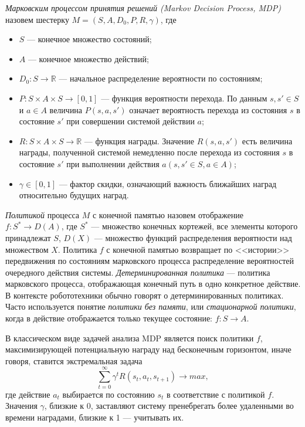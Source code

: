 \documentclass[a4, 14pt]{article}
\begin{document}
\textit{Марковским процессом принятия решений (Markov Decision Process, MDP)} 
назовем шестерку $M = (S, A, D_0, P, R, \gamma)$, где
\begin{itemize}
  \item $S$ --- конечное множество состояний;
  \item $A$ --- конечное множество действий;
  \item $D_0: S\rightarrow\mathbb{R}$ --- начальное распределение вероятности по состояниям;
  \item $P: S\times{A}\times{S}\rightarrow[0,1]$ --- функция вероятности перехода. 
    По данным $s, s' \in S$ и $a \in A$ величина $P(s,a,s')$ означает вероятность 
    перехода из состояния $s$ в состояние $s'$ при совершении системой действии $a$;
  \item $R: S\times{A}\times{S}\rightarrow\mathbb{R}$ --- функция награды. Значение 
    $R(s,a,s')$ есть величина награды, полученной системой немедленно после 
    перехода из состояния $s$ в состояние $s'$ при выполнении действия 
    $a (s,s' \in S, a \in A)$;
  \item $\gamma \in [0,1]$ --- фактор скидки, означающий важность ближайших 
    наград относительно будущих наград.
\end{itemize}

\textit{Политикой} процесса $M$ с конечной памятью назовем отображение $f: S^*\rightarrow{D}(A)$, 
где  $S^*$ --- множество конечных кортежей, все элементы которого принадлежат $S$, 
$D(X)$ --- множество функций распределения вероятности над множеством $X$. 
Политика $f$ с конечной памятью возвращает по <<истории>> передвижения по состояниям марковского 
процесса распределение вероятностей очередного действия системы. 
\textit{Детерминированная политика} --- политика марковского процесса, отображающая 
конечный путь в одно конкретное действие. В контексте робототехники обычно говорят
о детерминированных политиках. Часто используется понятие \textit{политики без памяти}, или
\textit{стационарной политики}, когда в действие отображается только текущее состояние: $f: S\rightarrow{A}$.

В классическом виде задачей анализа MDP является поиск политики $f$, 
максимизирующей потенциальную награду над бесконечным горизонтом, иначе говоря, 
ставится экстремальная задача
$$\sum\limits_{t=0}^\infty\gamma^t R(s_t, a_t, s_{t+1})\rightarrow{}max,$$
где действие $a_t$ выбирается по состоянию $s_t$ в соответствие с политикой $f$. 
Значения $\gamma$, близкие к 0, заставляют систему пренебрегать более удаленными 
во времени наградами, близкие к 1 --- учитывать их.
\end{document}
